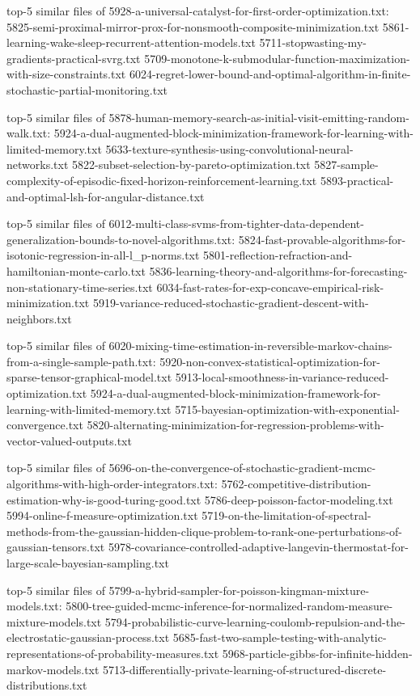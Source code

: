 \documentclass[11pt]{article}
\begin{document}
top-5 similar files of
5928-a-universal-catalyst-for-first-order-optimization.txt:
5825-semi-proximal-mirror-prox-for-nonsmooth-composite-minimization.txt
5861-learning-wake-sleep-recurrent-attention-models.txt
5711-stopwasting-my-gradients-practical-svrg.txt
5709-monotone-k-submodular-function-maximization-with-size-constraints.txt
6024-regret-lower-bound-and-optimal-algorithm-in-finite-stochastic-partial-monitoring.txt

top-5 similar files of
5878-human-memory-search-as-initial-visit-emitting-random-walk.txt:
5924-a-dual-augmented-block-minimization-framework-for-learning-with-limited-memory.txt
5633-texture-synthesis-using-convolutional-neural-networks.txt
5822-subset-selection-by-pareto-optimization.txt
5827-sample-complexity-of-episodic-fixed-horizon-reinforcement-learning.txt
5893-practical-and-optimal-lsh-for-angular-distance.txt

top-5 similar files of
6012-multi-class-svms-from-tighter-data-dependent-generalization-bounds-to-novel-algorithms.txt:
5824-fast-provable-algorithms-for-isotonic-regression-in-all-l\_p-norms.txt
5801-reflection-refraction-and-hamiltonian-monte-carlo.txt
5836-learning-theory-and-algorithms-for-forecasting-non-stationary-time-series.txt
6034-fast-rates-for-exp-concave-empirical-risk-minimization.txt
5919-variance-reduced-stochastic-gradient-descent-with-neighbors.txt

top-5 similar files of
6020-mixing-time-estimation-in-reversible-markov-chains-from-a-single-sample-path.txt:
5920-non-convex-statistical-optimization-for-sparse-tensor-graphical-model.txt
5913-local-smoothness-in-variance-reduced-optimization.txt
5924-a-dual-augmented-block-minimization-framework-for-learning-with-limited-memory.txt
5715-bayesian-optimization-with-exponential-convergence.txt
5820-alternating-minimization-for-regression-problems-with-vector-valued-outputs.txt

top-5 similar files of
5696-on-the-convergence-of-stochastic-gradient-mcmc-algorithms-with-high-order-integrators.txt:
5762-competitive-distribution-estimation-why-is-good-turing-good.txt
5786-deep-poisson-factor-modeling.txt
5994-online-f-measure-optimization.txt
5719-on-the-limitation-of-spectral-methods-from-the-gaussian-hidden-clique-problem-to-rank-one-perturbations-of-gaussian-tensors.txt
5978-covariance-controlled-adaptive-langevin-thermostat-for-large-scale-bayesian-sampling.txt

top-5 similar files of
5799-a-hybrid-sampler-for-poisson-kingman-mixture-models.txt:
5800-tree-guided-mcmc-inference-for-normalized-random-measure-mixture-models.txt
5794-probabilistic-curve-learning-coulomb-repulsion-and-the-electrostatic-gaussian-process.txt
5685-fast-two-sample-testing-with-analytic-representations-of-probability-measures.txt
5968-particle-gibbs-for-infinite-hidden-markov-models.txt
5713-differentially-private-learning-of-structured-discrete-distributions.txt
\end{document}
